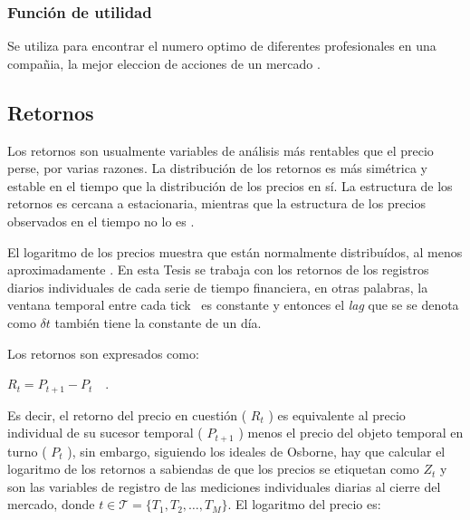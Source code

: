 \subsubsection*{Función de utilidad}

Se utiliza para encontrar el numero optimo de diferentes profesionales en una compañia, la mejor eleccion de acciones de un mercado \citep[][]{richmond}. 


\subsection{Retornos} 
Los retornos son usualmente variables de análisis más rentables que el precio perse, por varias razones. 
La distribución de los retornos es más simétrica y estable en el tiempo que la distribución de los precios en sí. 
La estructura de los retornos es cercana a estacionaria, mientras que la estructura de los precios observados en el tiempo no lo es \citep[][pagina 17]{dacoragna}.

El logaritmo de los precios muestra que están normalmente distribuídos, al menos aproximadamente \citep[][]{osborne}. En esta Tesis se trabaja con los retornos de los registros diarios individuales de cada serie de tiempo financiera, en otras palabras, la ventana temporal entre cada \guillemotleft tick\guillemotright~ es constante y entonces el \textit{lag} que se se denota como $\delta t$ también tiene la constante de un día. 


Los retornos son expresados como:
\begin{center}
$R_t=P_{t+1}-P_t$~~.
\end{center}
Es decir, el retorno del precio en cuestión ( $R_t$ ) es equivalente al precio individual de su sucesor temporal ( $P_{t+1}$ ) menos el precio del objeto temporal en turno ( $P_t$ ), sin embargo, siguiendo los ideales de Osborne, hay que calcular el logaritmo de los retornos a sabiendas de que los precios se etiquetan como $\mathit{Z_t}$ y son las variables de registro de las mediciones individuales diarias al cierre del mercado, donde \newline $t \in \mathcal{T} = \{\mathit{T_1,T_2,\ldots , T_M}\}$. El logaritmo del precio es:

